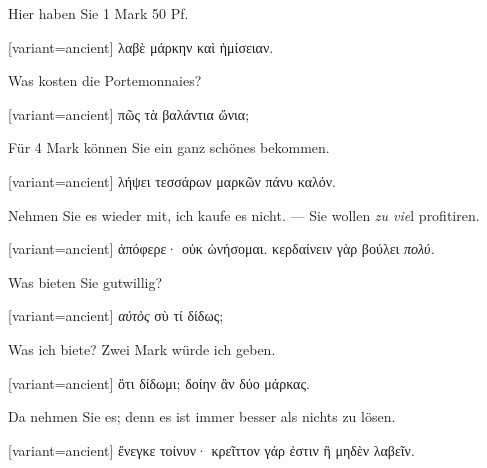 Hier haben Sie 1 Mark 50 Pf. 

\switchcolumn

\begin{greek}[variant=ancient]%
λαβὲ μάρκην καὶ ἡμίσειαν.

\end{greek}%
\switchcolumn*

Was kosten die Portemonnaies? 

\switchcolumn

\begin{greek}[variant=ancient]%
πῶς τὰ βαλάντια ὤνια;

\end{greek}%
\switchcolumn*

Für 4 Mark können Sie ein ganz schönes bekommen. 

\switchcolumn

\begin{greek}[variant=ancient]%
λήψει τεσσάρων μαρκῶν πάνυ καλόν.

\end{greek}%
\switchcolumn*

Nehmen Sie es wieder mit, ich kaufe es nicht. — Sie wollen \emph{zu
vie}l profitiren. 

\switchcolumn

\begin{greek}[variant=ancient]%
ἀπόφερε· οὐκ ὠνήσομαι. κερδαίνειν γὰρ βούλει \emph{πολύ.}

\end{greek}%
\switchcolumn*

Was bieten Sie gutwillig? 

\switchcolumn

\begin{greek}[variant=ancient]%
\emph{αὐτὸς} σὺ τί δίδως;

\end{greek}%
\switchcolumn*

Was ich biete? Zwei Mark würde ich geben. 

\switchcolumn

\begin{greek}[variant=ancient]%
ὅτι δίδωμι; δοίην ἂν δύο μάρκας.

\end{greek}%
\switchcolumn*

Da nehmen Sie es; denn es ist immer besser als nichts zu lösen. 

\switchcolumn

\begin{greek}[variant=ancient]%
ἔνεγκε τοίνυν· κρεῖττον γάρ ἐστιν ἢ μηδὲν λαβεῖν.

\end{greek}%
\switchcolumn*

